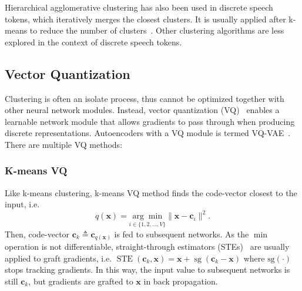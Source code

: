 Hierarchical agglomerative clustering has also been used in discrete speech tokens, which iteratively merges the closest clusters.
It is usually applied after k-means to reduce the number of clusters~\cite{cho2024sd,baade2024syllablelm}.
Other clustering algorithms are less explored in the context of discrete speech tokens.

\vspace{-0.12in}
\subsection{Vector Quantization}
\vspace{-0.04in}

\IEEEpubidadjcol

Clustering is often an isolate process, thus cannot be optimized together with other neural network modules.
Instead, vector quantization (VQ)~\cite{gray1984vector} enables a learnable network module that allows gradients to pass through when producing discrete representations.
Autoencoders with a VQ module is termed VQ-VAE~\cite{VQVAE}.
There are multiple VQ methods:

\subsubsection{K-means VQ}
Like k-means clustering, k-means VQ method finds the code-vector closest to the input, i.e. 
\begin{equation}
    q(\bm x)=\underset{i\in \{1,2,...,V\}}{\arg\min} \|\bm x-\bm c_i\|^2.
\end{equation}
Then, code-vector $\bm c_k\triangleq\bm c_{q(\mathbf x)}$ is fed to subsequent networks.
As the $\min$ operation is not differentiable, straight-through estimators (STEs)~\cite{bengio2013estimating} are usually applied to graft gradients, i.e. $\operatorname{STE}(\bm c_k,\bm x)=\bm x+\operatorname{sg}(\bm c_k-\bm x)$ where $\operatorname{sg(\cdot)}$ stops tracking gradients.
In this way, the input value to subsequent networks is still $\bm c_k$, but gradients are grafted to $\bm x$ in back propagation.

